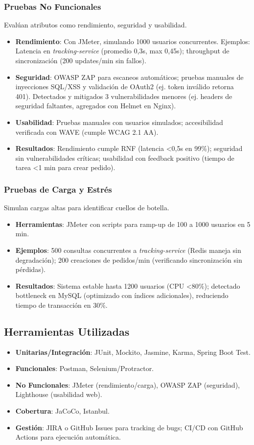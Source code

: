 \documentclass[a4paper,12pt]{article}
\begin{document}
\subsubsection{Pruebas No Funcionales}
Evalúan atributos como rendimiento, seguridad y usabilidad.
\begin{itemize}
    \item \textbf{Rendimiento}: Con JMeter, simulando 1000 usuarios concurrentes. Ejemplos: Latencia en \textit{tracking-service} (promedio 0,3s, max 0,45s); throughput de sincronización (200 updates/min sin fallos).
    \item \textbf{Seguridad}: OWASP ZAP para escaneos automáticos; pruebas manuales de inyecciones SQL/XSS y validación de OAuth2 (ej. token inválido retorna 401). Detectados y mitigados 3 vulnerabilidades menores (ej. headers de seguridad faltantes, agregados con Helmet en Nginx).
    \item \textbf{Usabilidad}: Pruebas manuales con usuarios simulados; accesibilidad verificada con WAVE (cumple WCAG 2.1 AA).
    \item \textbf{Resultados}: Rendimiento cumple RNF (latencia <0,5s en 99\%); seguridad sin vulnerabilidades críticas; usabilidad con feedback positivo (tiempo de tarea <1 min para crear pedido).
\end{itemize}

\subsubsection{Pruebas de Carga y Estrés}
Simulan cargas altas para identificar cuellos de botella.
\begin{itemize}
    \item \textbf{Herramientas}: JMeter con scripts para ramp-up de 100 a 1000 usuarios en 5 min.
    \item \textbf{Ejemplos}: 500 consultas concurrentes a \textit{tracking-service} (Redis maneja sin degradación); 200 creaciones de pedidos/min (verificando sincronización sin pérdidas).
    \item \textbf{Resultados}: Sistema estable hasta 1200 usuarios (CPU <80\%); detectado bottleneck en MySQL (optimizado con índices adicionales), reduciendo tiempo de transacción en 30\%.
\end{itemize}

\subsection{Herramientas Utilizadas}
\begin{itemize}
    \item \textbf{Unitarias/Integración}: JUnit, Mockito, Jasmine, Karma, Spring Boot Test.
    \item \textbf{Funcionales}: Postman, Selenium/Protractor.
    \item \textbf{No Funcionales}: JMeter (rendimiento/carga), OWASP ZAP (seguridad), Lighthouse (usabilidad web).
    \item \textbf{Cobertura}: JaCoCo, Istanbul.
    \item \textbf{Gestión}: JIRA o GitHub Issues para tracking de bugs; CI/CD con GitHub Actions para ejecución automática.
\end{itemize}
\end{document}
